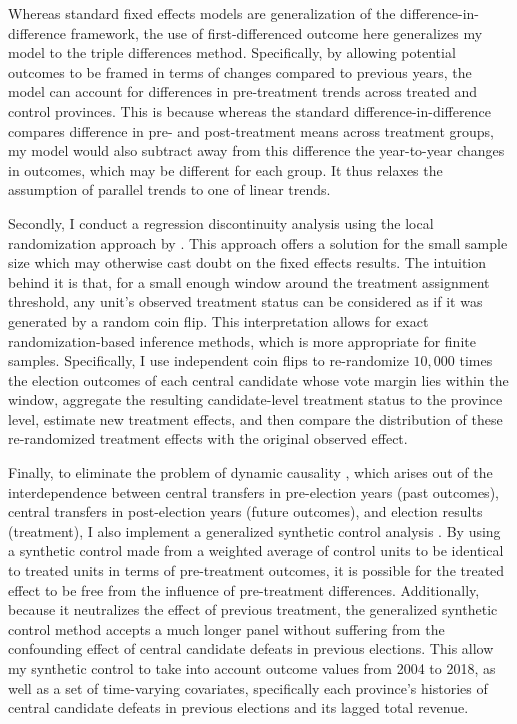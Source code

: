 \documentclass[12pt]{article}
\newcommand{\1}{\mathbbm{1}}
\begin{document}
Whereas standard fixed effects models are generalization of the difference-in-difference framework, the use of first-differenced outcome here generalizes my model to the triple differences method. Specifically, by allowing potential outcomes to be framed in terms of changes compared to previous years, the model can account for differences in pre-treatment trends across treated and control provinces. This is because whereas the standard difference-in-difference compares difference in pre- and post-treatment means across treatment groups, my model would also subtract away from this difference the year-to-year changes in outcomes, which may be different for each group. It thus relaxes the assumption of parallel trends to one of linear trends.

Secondly, I conduct a regression discontinuity analysis using the local randomization approach by \citet{CattaneoTitiunik2015}. This approach offers a solution for the small sample size which may otherwise cast doubt on the fixed effects results. The intuition behind it is that, for a small enough window around the treatment assignment threshold, any unit's observed treatment status can be considered as if it was generated by a random coin flip. This interpretation allows for exact randomization-based inference methods, which is more appropriate for finite samples. Specifically, I use independent coin flips to re-randomize $10,000$ times the election outcomes of each central candidate whose vote margin lies within the window, aggregate the resulting candidate-level treatment status to the province level, estimate new treatment effects, and then compare  the distribution of these re-randomized treatment effects with the original observed effect.

Finally, to eliminate the problem of dynamic causality \citep{ImaiKim2019}, which arises out of the interdependence between central transfers in pre-election years (past outcomes), central transfers in post-election years (future outcomes), and election results (treatment), I also implement a generalized synthetic control analysis \citep{Xu2017gsynth}. By using a synthetic control made from a weighted average of control units to be identical to treated units in terms of pre-treatment outcomes, it is possible for the treated effect to be free from the influence of pre-treatment differences. Additionally, because it neutralizes the effect of previous treatment, the generalized synthetic control method accepts a much longer panel without suffering from the confounding effect of central candidate defeats in previous elections. This allow my synthetic control to take into account outcome values from 2004 to 2018, as well as a set of time-varying covariates, specifically each province's histories of central candidate defeats in previous elections and its lagged total revenue.
\end{document}
